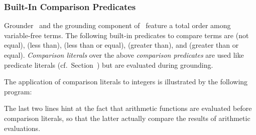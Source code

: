 \subsubsection{Built-In Comparison Predicates}\label{subsec:gringo:comp}

Grounder \gringo\ and the grounding component of \clingo\ 
feature a total order among variable-free terms.
The following built-in predicates to compare terms are
\code{!=} (not equal),
\code{<} (less than),
\code{<=} (less than or equal),
\code{>} (greater than), and
\code{>=} (greater than or equal).
\emph{Comparison literals} over the above \emph{comparison predicates} are used like predicate literals (cf.\ Section~\pageref{subsec:gringo:normal})
but are evaluated during grounding.

\begin{example}\label{ex:arith:pred}
The application of comparison literals to integers
is illustrated by the following program:%
%

%
The last two lines hint at the fact that arithmetic functions are evaluated
before comparison literals, so that the latter actually compare the
results of arithmetic evaluations.
\eexample
\end{example}

